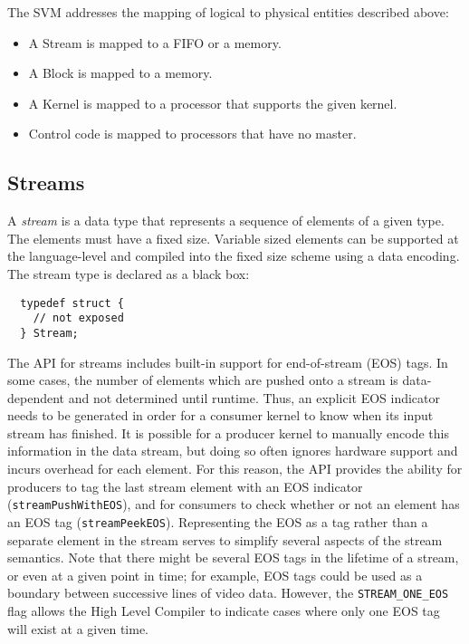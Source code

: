 The SVM addresses the mapping of logical to physical entities
described above:

\begin{itemize}

\item A Stream is mapped to a FIFO or a memory.

\item A Block is mapped to a memory.

\item A Kernel is mapped to a processor that supports the given kernel.

\item Control code is mapped to processors that have no master.

\end{itemize}

\subsection{Streams}
\label{sec:streams}

A {\it stream} is a data type that represents a sequence of elements
of a given type.  The elements must have a fixed size. Variable sized
elements can be supported at the language-level and compiled into the
fixed size scheme using a data encoding. The stream type is declared
as a black box:
{\small
\begin{verbatim}
  typedef struct {
    // not exposed
  } Stream;
\end{verbatim}}
The API for streams includes built-in support for end-of-stream (EOS)
tags.  In some cases, the number of elements which are pushed onto a
stream is data-dependent and not determined until runtime.  Thus, an
explicit EOS indicator needs to be generated in order for a consumer
kernel to know when its input stream has finished.  It is possible for
a producer kernel to manually encode this information in the data
stream, but doing so often ignores hardware support and incurs
overhead for each element.  For this reason, the API provides the
ability for producers to tag the last stream element with an EOS
indicator ({\tt streamPushWithEOS}), and for consumers to check
whether or not an element has an EOS tag ({\tt streamPeekEOS}).
Representing the EOS as a tag rather than a separate element in the
stream serves to simplify several aspects of the stream semantics.
Note that there might be several EOS tags in the lifetime of a stream,
or even at a given point in time; for example, EOS tags could be used
as a boundary between successive lines of video data.  However, the
{\tt STREAM\_ONE\_EOS} flag allows the High Level Compiler to indicate
cases where only one EOS tag will exist at a given time.

